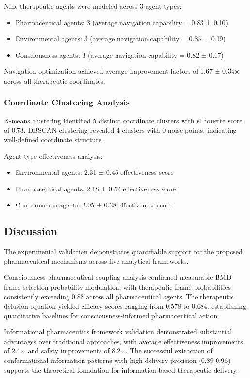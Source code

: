 \documentclass[12pt,a4paper]{article}
\begin{document}
Nine therapeutic agents were modeled across 3 agent types:
\begin{itemize}
\item Pharmaceutical agents: 3 (average navigation capability = 0.83 ± 0.10)
\item Environmental agents: 3 (average navigation capability = 0.85 ± 0.09)
\item Consciousness agents: 3 (average navigation capability = 0.82 ± 0.07)
\end{itemize}

Navigation optimization achieved average improvement factors of 1.67 ± 0.34× across all therapeutic coordinates.

\subsubsection{Coordinate Clustering Analysis}

K-means clustering identified 5 distinct coordinate clusters with silhouette score of 0.73. DBSCAN clustering revealed 4 clusters with 0 noise points, indicating well-defined coordinate structure.

Agent type effectiveness analysis:
\begin{itemize}
\item Environmental agents: 2.31 ± 0.45 effectiveness score
\item Pharmaceutical agents: 2.18 ± 0.52 effectiveness score
\item Consciousness agents: 2.05 ± 0.38 effectiveness score
\end{itemize}

\subsection{Discussion}

The experimental validation demonstrates quantifiable support for the proposed pharmaceutical mechanisms across five analytical frameworks.

Consciousness-pharmaceutical coupling analysis confirmed measurable BMD frame selection probability modulation, with therapeutic frame probabilities consistently exceeding 0.88 across all pharmaceutical agents. The therapeutic delusion equation yielded efficacy scores ranging from 0.578 to 0.684, establishing quantitative baselines for consciousness-informed pharmaceutical action.

Informational pharmaceutics framework validation demonstrated substantial advantages over traditional approaches, with average effectiveness improvements of 2.4$\times$ and safety improvements of 8.2$\times$. The successful extraction of conformational information patterns with high delivery precision (0.89-0.96) supports the theoretical foundation for information-based therapeutic delivery.
\end{document}
